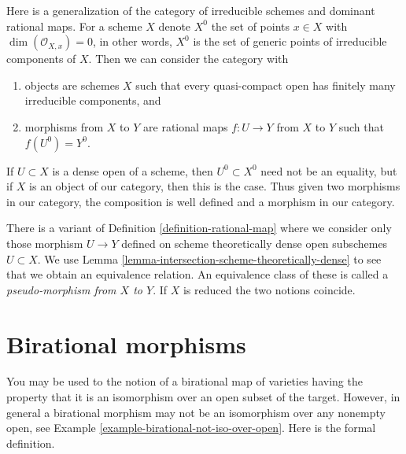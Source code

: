 \begin{remark}
\label{remark-generalize-category}
Here is a generalization of the category of irreducible schemes and
dominant rational maps. For a scheme $X$ denote $X^0$ the set of
points $x \in X$ with $\dim(\mathcal{O}_{X, x}) = 0$, in other words,
$X^0$ is the set of generic points of irreducible components of $X$.
Then we can consider the category with
\begin{enumerate}
\item objects are schemes $X$ such that every quasi-compact open has
finitely many irreducible components, and
\item morphisms from $X$ to $Y$ are rational maps $f : U \to Y$
from $X$ to $Y$ such that $f(U^0) = Y^0$.
\end{enumerate}
If $U \subset X$ is a dense open of a scheme, then
$U^0 \subset X^0$ need not be an equality, but if $X$ is an
object of our category, then this is the case.
Thus given two morphisms in our category, the composition
is well defined and a morphism in our category.
\end{remark}

\begin{remark}
\label{remark-pseudo-morphisms}
There is a variant of Definition \ref{definition-rational-map}
where we consider only those morphism $U \to Y$ defined on
scheme theoretically dense open subschemes $U \subset X$.
We use Lemma \ref{lemma-intersection-scheme-theoretically-dense}
to see that we obtain an equivalence relation.
An equivalence class of these is called a
{\it pseudo-morphism from $X$ to $Y$}.
If $X$ is reduced the two notions coincide.
\end{remark}






\section{Birational morphisms}
\label{section-birational}

\noindent
You may be used to the notion of a birational map of varieties
having the property that it is an isomorphism over an open subset
of the target. However, in general a birational morphism may
not be an isomorphism over any nonempty open, see
Example \ref{example-birational-not-iso-over-open}.
Here is the formal definition.


